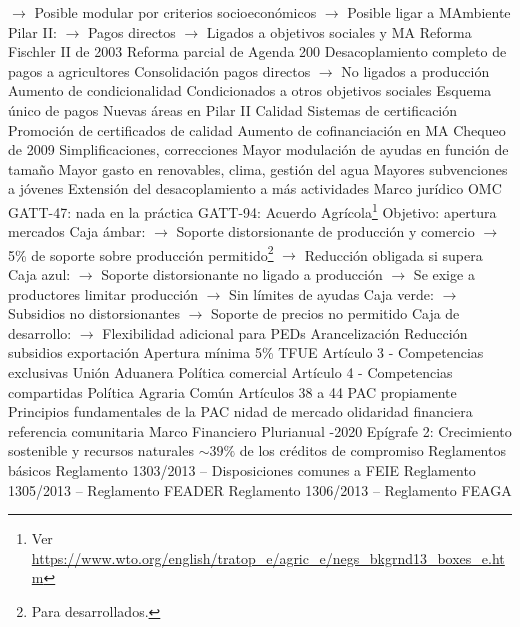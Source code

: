 \documentclass{nuevotema}
\begin{document}
\begin{esquemal}
				\4[] $\to$ Posible modular por criterios socioeconómicos
				\4[] $\to$ Posible ligar a MAmbiente
				\4[] Pilar II:
				\4[] $\to$ Pagos directos
				\4[] $\to$ Ligados a objetivos sociales y MA
			\3 Reforma Fischler II de 2003
				\4 Reforma parcial de Agenda 200
				\4 Desacoplamiento completo de pagos a agricultores
				\4[] Consolidación pagos directos
				\4[] $\to$ No ligados a producción
				\4 Aumento de condicionalidad
				\4[] Condicionados a otros objetivos sociales
				\4[] Esquema único de pagos
				\4 Nuevas áreas en Pilar II
				\4[] Calidad
				\4[] Sistemas de certificación
				\4[] Promoción de certificados de calidad
				\4[] Aumento de cofinanciación en MA
			\3 Chequeo de 2009
				\4[] Simplificaciones, correcciones
				\4 Mayor modulación de ayudas en función de tamaño
				\4 Mayor gasto en renovables, clima, gestión del agua
				\4 Mayores subvenciones a jóvenes
				\4 Extensión del desacoplamiento a más actividades
		\2 Marco jurídico
			\3 OMC
				\4 GATT-47: nada en la práctica
				\4 GATT-94: Acuerdo Agrícola\footnote{ Ver \url{https://www.wto.org/english/tratop_e/agric_e/negs_bkgrnd13_boxes_e.htm}}
				\4[] Objetivo: apertura mercados
				\4[] Caja ámbar:
				\4[] $\to$ Soporte distorsionante de producción y comercio
				\4[] $\to$ 5\% de soporte sobre producción permitido\footnote{Para desarrollados.}
				\4[] $\to$ Reducción obligada si supera
				\4[] Caja azul:
				\4[] $\to$ Soporte distorsionante no ligado a producción
				\4[] $\to$ Se exige a productores limitar producción
				\4[] $\to$ Sin límites de ayudas
				\4[] Caja verde:
				\4[] $\to$ Subsidios no distorsionantes
				\4[] $\to$ Soporte de precios no permitido
				\4[] Caja de desarrollo:
				\4[] $\to$ Flexibilidad adicional para PEDs
				\4[] Arancelización
				\4[] Reducción subsidios exportación
				\4[] Apertura mínima 5\%
			\3 TFUE
				\4 Artículo 3 - Competencias exclusivas
				\4[] Unión Aduanera
				\4[] Política comercial
				\4 Artículo 4 - Competencias compartidas
				\4[] Política Agraria Común
				\4 Artículos 38 a 44
				\4[] PAC propiamente
			\3 Principios fundamentales de la PAC
				\4[] nidad de mercado
				\4[] olidaridad financiera
				\4[] referencia comunitaria
			\3 Marco Financiero Plurianual
				-2020
				\4 Epígrafe 2:
				\4[] Crecimiento sostenible y recursos naturales
				\4[] $\sim 39\%$ de los créditos de compromiso
			\3 Reglamentos básicos
				\4 Reglamento 1303/2013 -- Disposiciones comunes a FEIE
				\4 Reglamento 1305/2013 -- Reglamento FEADER
				\4 Reglamento 1306/2013 -- Reglamento FEAGA

\end{esquemal}
\end{document}
